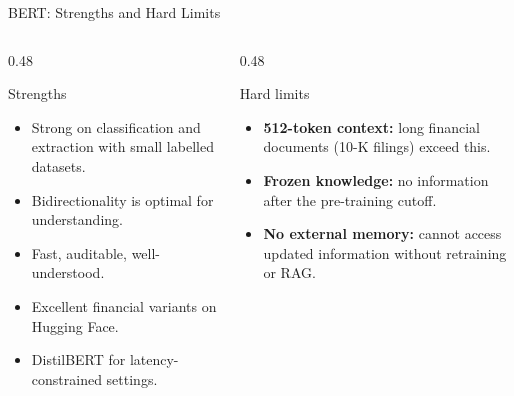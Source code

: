 \documentclass[11pt,aspectratio=169,professionalfonts]{beamer}
\begin{document}
\begin{frame}{BERT: Strengths and Hard Limits}
  \begin{columns}[T]
    \begin{column}{0.48\linewidth}
      \begin{block}{Strengths}
        \begin{itemize}
          \item Strong on classification and extraction
                with small labelled datasets.
          \item Bidirectionality is optimal for understanding.
          \item Fast, auditable, well-understood.
          \item Excellent financial variants on Hugging Face.
          \item DistilBERT for latency-constrained settings.
        \end{itemize}
      \end{block}
    \end{column}
    \begin{column}{0.48\linewidth}
      \begin{alertblock}{Hard limits}
        \begin{itemize}
          \item \textbf{512-token context:} long financial
                documents (10-K filings) exceed this.
          \item \textbf{Frozen knowledge:} no information
                after the pre-training cutoff.
          \item \textbf{No external memory:} cannot access
                updated information without retraining or RAG.
        \end{itemize}
      \end{alertblock}
    \end{column}
  \end{columns}
\end{frame}
%
%
\end{document}
